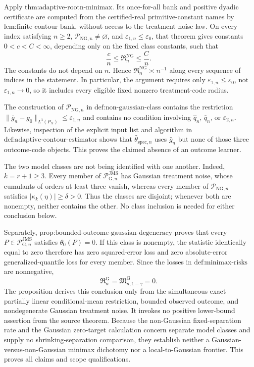 Apply \(\text{thm:adaptive-rootn-minimax}\).  Its once-for-all bank and positive dyadic certificate are computed from the certified-real primitive-constant names by \(\text{lem:finite-contour-bank}\), without access to the treatment-noise law.  On every index satisfying \(n\ge2\), \(\mathcal P_{\mathrm{NG},n}\neq\varnothing\), and \(\varepsilon_{1,n}\le\varepsilon_0\), that theorem gives constants \(0<c<C<\infty\), depending only on the fixed class constants, such that
\[
 \frac{c}{n}
 \le \mathfrak R_n^{\mathrm{NG}}
 \le \frac{C}{n}.
\]
The constants do not depend on \(n\).  Hence \(\mathfrak R_n^{\mathrm{NG}}\asymp n^{-1}\) along every sequence of indices in the statement.  In particular, the argument requires only \(\varepsilon_{1,n}\le\varepsilon_0\), not \(\varepsilon_{1,n}\to0\), so it includes every eligible fixed nonzero treatment-code radius.

The construction of \(\mathcal P_{\mathrm{NG},n}\) in \(\text{def:non-gaussian-class}\) contains the restriction \(\lVert\bar g_n-g_0\rVert_{L^1(P_X)}\le\varepsilon_{1,n}\) and contains no condition involving \(\widehat q_n\), \(\bar q_n\), or \(\varepsilon_{2,n}\).  Likewise, inspection of the explicit input list and algorithm in \(\text{def:adaptive-contour-estimator}\) shows that \(\widehat\theta_{\mathrm{spec},n}\) uses \(\bar g_n\) but none of those three outcome-code objects.  This proves the claimed absence of an outcome learner.

The two model classes are not being identified with one another.  Indeed, \(k=r+1\ge3\).  Every member of \(\mathcal P_{\mathrm G,n}^{\mathrm{JMS}}\) has Gaussian treatment noise, whose cumulants of orders at least three vanish, whereas every member of \(\mathcal P_{\mathrm{NG},n}\) satisfies \(\lvert\kappa_k(\eta)\rvert\ge\delta>0\).  Thus the classes are disjoint; whenever both are nonempty, neither contains the other.  No class inclusion is needed for either conclusion below.

Separately, \(\text{prop:bounded-outcome-gaussian-degeneracy}\) proves that every \(P\in\mathcal P_{\mathrm G,n}^{\mathrm{JMS}}\) satisfies \(\theta_0(P)=0\).  If this class is nonempty, the statistic identically equal to zero therefore has zero squared-error loss and zero absolute-error generalized-quantile loss for every member.  Since the losses in \(\text{def:minimax-risks}\) are nonnegative,
\[
 \mathfrak R_n^{\mathrm G}
 =\mathfrak M_{n,1-\gamma}^{\mathrm G}
 =0.
\]
The proposition derives this conclusion only from the simultaneous exact partially linear conditional-mean restriction, bounded observed outcome, and nondegenerate Gaussian treatment noise.  It invokes no positive lower-bound assertion from the source theorem.  Because the non-Gaussian fixed-separation rate and the Gaussian zero-target calculation concern separate model classes and supply no shrinking-separation comparison, they establish neither a Gaussian-versus-non-Gaussian minimax dichotomy nor a local-to-Gaussian frontier.  This proves all claims and scope qualifications.